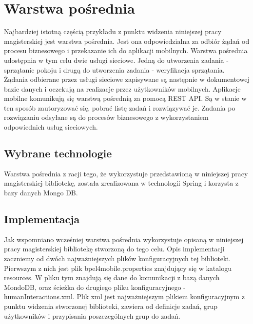 

\section{Warstwa pośrednia }
\label{sec:exampleMiddleware}

Najbardziej istotną częścią przykładu z punktu widzenia niniejszej pracy magisterskiej jest warstwa pośrednia. Jest ona odpowiedzialna za odbiór  żądań od procesu biznesowego i przekazanie ich do aplikacji mobilnych. Warstwa pośrednia udostępnia w tym celu dwie usługi sieciowe. Jedną do utworzenia zadania - sprzątanie pokoju i drugą do utworzenia zadania - weryfikacja sprzątania. Żądania odbierane przez usługi sieciowe zapisywane są następnie w dokumentowej bazie danych i oczekują na realizacje przez użytkowników mobilnych. Aplikacje mobilne komunikują się warstwą pośrednią za pomocą REST API. Są w stanie w ten sposób zautoryzować się, pobrać listę zadań i rozwiązywać je. Zadania po rozwiązaniu odsyłane są do procesów biznesowego z wykorzystaniem odpowiednich usług sieciowych. 

\subsection{Wybrane technologie}
Warstwa pośrednia z racji tego, że wykorzystuje przedstawioną w niniejszej pracy magisterskiej bibliotekę, została zrealizowana w technologii Spring i korzysta z bazy danych Mongo DB.

\subsection{Implementacja}

Jak wspomniano wcześniej warstwa pośrednia wykorzystuje opisaną w niniejszej pracy magisterskiej bibliotekę stworzoną do tego celu. Opis implementacji zaczniemy od dwóch najważniejszych plików konfiguracyjnych tej biblioteki. Pierwszym z nich jest plik bpel4mobile.properties znajdujący się w katalogu resources. W pliku tym znajdują się dane do komunikacji z bazą danych MondoDB, oraz ścieżka do drugiego pliku konfiguracyjnego - humanInteractions.xml. Plik xml jest najważniejszym plikiem konfiguracyjnym z punktu widzenia stworzonej biblioteki, zawiera od definicje zadań, grup użytkowników i przypisania poszczególnych grup do zadań. 

